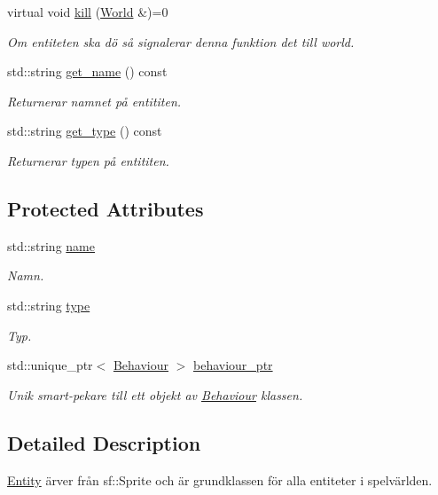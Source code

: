 \begin{DoxyCompactItemize}
virtual void \hyperlink{classEntity_a3d585a30d7f07c50911485825f5496cd}{kill} (\hyperlink{classWorld}{World} \&)=0
\begin{DoxyCompactList}\small\item\em Om entiteten ska dö så signalerar denna funktion det till world. \end{DoxyCompactList}\item 
std\+::string \hyperlink{classEntity_a75c7e4aad3df2e053ee5b43169509534}{get\+\_\+name} () const 
\begin{DoxyCompactList}\small\item\em Returnerar namnet på entititen. \end{DoxyCompactList}\item 
std\+::string \hyperlink{classEntity_a0e9ef479c1147e21e5bcb338cb858df2}{get\+\_\+type} () const 
\begin{DoxyCompactList}\small\item\em Returnerar typen på entititen. \end{DoxyCompactList}\end{DoxyCompactItemize}
\subsection*{Protected Attributes}
\begin{DoxyCompactItemize}
\item 
std\+::string \hyperlink{classEntity_a931b21fbdebb1a5963b4bcab5df128f5}{name}
\begin{DoxyCompactList}\small\item\em Namn. \end{DoxyCompactList}\item 
std\+::string \hyperlink{classEntity_a298a9ebf2474bb00874b5ff6a0d637ef}{type}
\begin{DoxyCompactList}\small\item\em Typ. \end{DoxyCompactList}\item 
std\+::unique\+\_\+ptr$<$ \hyperlink{classBehaviour}{Behaviour} $>$ \hyperlink{classEntity_adb6e36848db24e6d48e6d295e19d3972}{behaviour\+\_\+ptr}
\begin{DoxyCompactList}\small\item\em Unik smart-\/pekare till ett objekt av \hyperlink{classBehaviour}{Behaviour} klassen. \end{DoxyCompactList}\end{DoxyCompactItemize}


\subsection{Detailed Description}
\hyperlink{classEntity}{Entity} ärver från sf\+::\+Sprite och är grundklassen för alla entiteter i spelvärlden. 

